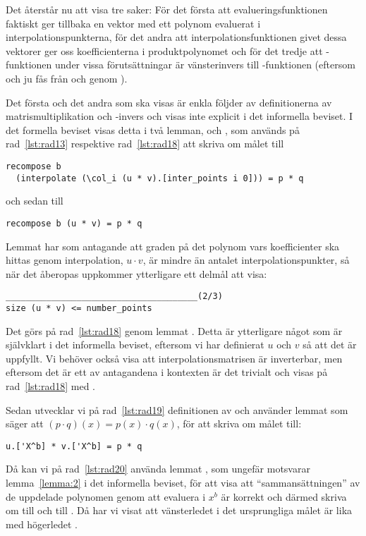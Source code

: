 Det återstår nu att visa tre saker: För det första att evalueringsfunktionen
 faktiskt ger tillbaka en vektor med ett polynom evaluerat i
interpolationspunkterna, för det andra att interpolationsfunktionen
 givet dessa vektorer ger oss koefficienterna i produktpolynomet
 och för det tredje att -funktionen under vissa
förutsättningar är vänsterinvers till -funktionen (eftersom  och
 ju fås från  och  genom ).

Det första och det andra som ska visas är enkla följder av definitionerna av
matrismultiplikation och -invers och visas inte explicit i det informella
beviset. I det formella beviset visas detta i två lemman, 
och , som används på rad~\ref{lst:rad13} respektive
rad~\ref{lst:rad18} att skriva om målet till
\begin{lstlisting}
recompose b
  (interpolate (\col_i (u * v).[inter_points i 0])) = p * q
\end{lstlisting}
och sedan till
\begin{lstlisting}
recompose b (u * v) = p * q
\end{lstlisting}
Lemmat  har som antagande att graden på det polynom vars
koefficienter ska hittas genom interpolation, $u \cdot v$, är mindre än antalet
interpolationspunkter, så när det åberopas uppkommer ytterligare ett delmål
att visa:
\begin{lstlisting}
______________________________________(2/3)
size (u * v) <= number_points
\end{lstlisting}
Det görs på rad~\ref{lst:rad18} genom lemmat . Detta är
ytterligare något som är självklart i det informella beviset, eftersom vi har
definierat $u$ och $v$ så att det är uppfyllt. Vi behöver också visa att
interpolationsmatrisen  är inverterbar, men eftersom det är ett av
antagandena i kontexten är det trivialt och visas på rad~\ref{lst:rad18} med
\C{//}.

Sedan utvecklar vi på rad~\ref{lst:rad19} definitionen av  och använder
lemmat  som säger att $(p \cdot q)(x) = p(x) \cdot q(x)$, för att
skriva om målet till:
\begin{lstlisting}
u.['X^b] * v.['X^b] = p * q
\end{lstlisting}
Då kan vi på rad~\ref{lst:rad20} använda lemmat , som ungefär
motsvarar lemma~\ref{lemma:2} i det informella beviset, för att visa att
``sammansättningen'' av de uppdelade polynomen genom att evaluera i $x^b$ är
korrekt och därmed skriva om  till  och  till
. Då har vi visat att vänsterledet i det ursprungliga målet är lika med
högerledet .

